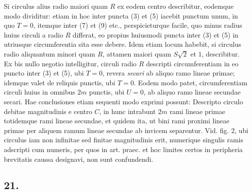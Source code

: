 \documentclass[14pt]{memoir}
\theoremstyle{plain}
\theoremstyle{remark}
\begin{document}
 Si circulus alius radio maiori quam \(R\) ex eodem centro describitur, eodemque modo dividitur: etiam in hoc inter puncta (3) et (5) iacebit punctum unum, in quo \(T= 0\), itemque inter (7) et (9) etc., perspicieturque facile, quo minus radius huius circuli a radio \(R\) differat, eo propius huiusmodi puncta inter (3) et (5) in utriusque circumferentia sita esse debere. Idem etiam locum habebit, si circulus radio aliquantum minori quam \(R\), attamen maiori quam \(S\surd{2}\) et \(1\), describitur.  Ex bis nullo negotio intelligitur, circuli radio \(R\) descripti circumferentiam in eo puncto inter (3) et (5), ubi \(T=0\), revera \textit{secari} ab aliquo ramo lineae primae; idemque valet de reliquis punctis, ubi \(T= 0\). Eodem modo patet, circumferentiam circuli huius in omnibus \(2m\) punctis, ubi \(U=0\), ab aliquo ramo lineae secundae secari. Hae conclusiones etiam sequenti modo exprimi possunt: Descripto circulo debitae magnitudinis e centro \(C\), in hunc intrabunt \(2m\) rami lineae primae totidemque rami lineae secundae, et quidem ita, ut bini rami proximi lineae primae per aliquem ramum lineae secundae ab invicem separentur.  Vid. fig. 2, ubi circulus iam non infinitae sed finitae magnitudinis erit, numerique singulis ramis adscripti cum numeris, per quos in art. praec. et hoc limites certos in peripheria brevitatis caussa designavi, non sunt confundendi.

\subsection*{21.}
\end{document}
